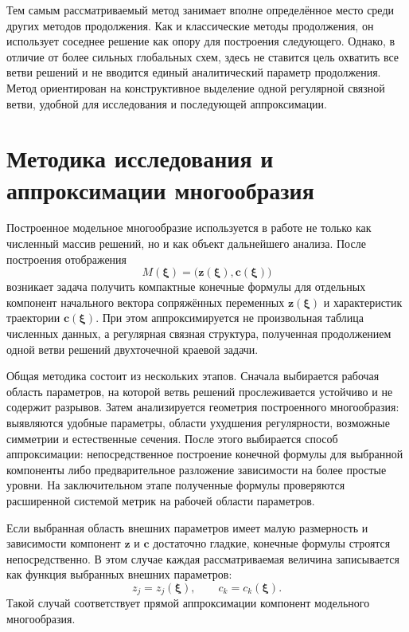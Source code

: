 Тем самым рассматриваемый метод занимает вполне определённое место среди других методов продолжения. Как и классические методы продолжения, он использует соседнее решение как опору для построения следующего. Однако, в отличие от более сильных глобальных схем, здесь не ставится цель охватить все ветви решений и не вводится единый аналитический параметр продолжения. Метод ориентирован на конструктивное выделение одной регулярной связной ветви, удобной для исследования и последующей аппроксимации.

\section{Методика исследования и аппроксимации многообразия}

Построенное модельное многообразие используется в работе не только как численный массив решений, но и как объект дальнейшего анализа. После построения отображения
\begin{equation}
	M(\boldsymbol\xi)
	=
	\bigl(
	\mathbf z(\boldsymbol\xi),
	\mathbf c(\boldsymbol\xi)
	\bigr)
\end{equation}
возникает задача получить компактные конечные формулы для отдельных компонент начального вектора сопряжённых переменных \(\mathbf z(\boldsymbol\xi)\) и характеристик траектории \(\mathbf c(\boldsymbol\xi)\). При этом аппроксимируется не произвольная таблица численных данных, а регулярная связная структура, полученная продолжением одной ветви решений двухточечной краевой задачи.

Общая методика состоит из нескольких этапов. Сначала выбирается рабочая область параметров, на которой ветвь решений прослеживается устойчиво и не содержит разрывов. Затем анализируется геометрия построенного многообразия: выявляются удобные параметры, области ухудшения регулярности, возможные симметрии и естественные сечения. После этого выбирается способ аппроксимации: непосредственное построение конечной формулы для выбранной компоненты либо предварительное разложение зависимости на более простые уровни. На заключительном этапе полученные формулы проверяются расширенной системой метрик на рабочей области параметров.

Если выбранная область внешних параметров имеет малую размерность и зависимости компонент \(\mathbf z\) и \(\mathbf c\) достаточно гладкие, конечные формулы строятся непосредственно. В этом случае каждая рассматриваемая величина записывается как функция выбранных внешних параметров:
\begin{equation}
	z_j=z_j(\boldsymbol\xi),
	\qquad
	c_k=c_k(\boldsymbol\xi).
\end{equation}
Такой случай соответствует прямой аппроксимации компонент модельного многообразия.

